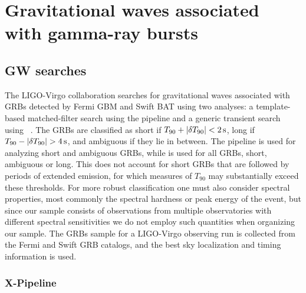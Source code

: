 \chapter{Gravitational waves associated with gamma-ray bursts}\label{ch:grb}


\section{GW searches}\label{sec:grb-searches}

The \ac{LIGO}-Virgo collaboration searches for gravitational waves associated with \acp{GRB} detected by Fermi \ac{GBM} and Swift \ac{BAT} using two analyses: a template-based matched-filter search using the \pygrb pipeline and a generic transient search using \xpip~\citep{grb_o3a,grb_o3b}.
The \acp{GRB} are classified as short if $T_{90} + \abs{\delta T_{90}} < 2\,\text{s}$, long if $T_{90} - \abs{\delta T_{90}} > 4\,\text{s}$, and ambiguous if they lie in between.
The \pygrb pipeline is used for analyzing short and ambiguous \acp{GRB}, while \xpip is used for all \acp{GRB}, short, ambiguous or long.
This does not account for short GRBs that are followed by periods of extended emission, for which measures of $T_{90}$ may substantially exceed these thresholds.
For more robust classification one must also consider spectral properties, most commonly the spectral hardness or peak energy of the event, but since our sample consists of observations from multiple observatories with different spectral sensitivities we do not employ such quantities when organizing our sample.
The \acp{GRB} sample for a LIGO-Virgo observing run is collected from the Fermi and Swift \ac{GRB} catalogs, and the best sky localization and timing information is used.

\subsection{X-Pipeline}\label{sec:grb-x}

